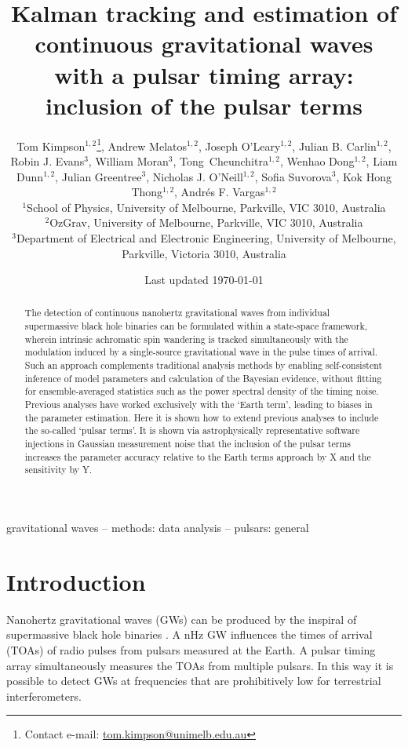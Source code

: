 \documentclass[fleqn,usenatbib,useAMS]{mnras}
\title[Kalman PTA]{Kalman tracking and estimation of continuous gravitational waves with a pulsar timing array: inclusion of the pulsar terms}
\author[Kimpson]{Tom Kimpson$^{1,2}$\thanks{Contact e-mail: \href{tom.kimpson@unimelb.edu.au}{tom.kimpson@unimelb.edu.au}}, Andrew Melatos$^{1,2}$, Joseph O'Leary$^{1,2}$, Julian B. Carlin$^{1,2}$, Robin J. Evans$^{3}$, \newauthor William Moran$^{3}$, Tong Cheunchitra$^{1,2}$, Wenhao Dong$^{1,2}$, Liam Dunn$^{1,2}$, Julian Greentree$^{3}$, Nicholas J. O'Neill$^{1,2}$, \newauthor Sofia Suvorova$^{3}$, Kok Hong Thong$^{1,2}$, Andrés F. Vargas$^{1,2}$%
\\
$^{1}$School of Physics, University of Melbourne, Parkville, VIC 3010, Australia \\
$^{2}$OzGrav, University of Melbourne, Parkville, VIC 3010, Australia \\
$^{3}$Department of Electrical and Electronic Engineering, University of Melbourne, Parkville, Victoria 3010, Australia }
\date{Last updated \today}
\begin{document}
\label{firstpage}
\pagerange{\pageref{firstpage}--\pageref{lastpage}}
\maketitle

\begin{abstract}	
	The detection of continuous nanohertz gravitational waves from individual supermassive black hole binaries can be formulated within a state-space framework, wherein intrinsic achromatic spin wandering is tracked simultaneously with the modulation induced by a single-source gravitational wave in the pulse times of arrival. Such an approach complements traditional analysis methods by enabling self-consistent inference of model parameters and calculation of the Bayesian evidence, without fitting for ensemble-averaged statistics such as the power spectral density of the timing noise. Previous analyses have worked exclusively with the `Earth term', leading to biases in the parameter estimation. Here it is shown how to extend previous analyses to include the so-called `pulsar terms'. It is shown via astrophysically representative software injections in Gaussian measurement noise that the inclusion of the pulsar terms increases the parameter accuracy relative to the Earth terms approach by X and the sensitivity by Y. 
\end{abstract}

\begin{keywords}
gravitational waves -- methods: data analysis -- pulsars: general
\end{keywords}



\begingroup
\let\clearpage\relax
\endgroup
\newpage
\section{Introduction}\label{sec:intro}
Nanohertz gravitational waves (GWs) can be produced by the inspiral of supermassive black hole binaries \citep[SMBHBs;][]{Rajagopal1995,Jaffe_2003, Wyithe2003,Sesana2013,McWilliams_2014,Ravi2015MNRAS.447.2772R,Burke2019, Skyes2022}. A nHz GW influences the times of arrival (TOAs) of radio pulses from pulsars measured at the Earth. A pulsar timing array \citep[PTA][]{Tiburzi2018, 2021hgwa.bookE...4V} simultaneously measures the TOAs from multiple pulsars. In this way it is possible to detect GWs at frequencies that are prohibitively low for terrestrial interferometers. \newline 
 
\end{document}
